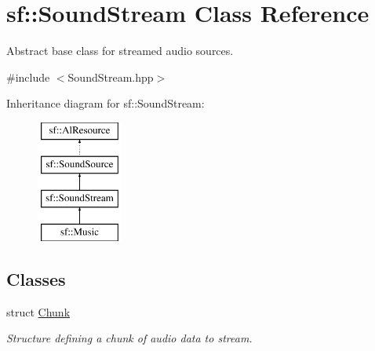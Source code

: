 \hypertarget{classsf_1_1_sound_stream}{}\section{sf\+:\+:Sound\+Stream Class Reference}
\label{classsf_1_1_sound_stream}


Abstract base class for streamed audio sources.  




{\ttfamily \#include $<$Sound\+Stream.\+hpp$>$}

Inheritance diagram for sf\+:\+:Sound\+Stream\+:\begin{figure}[H]
\begin{center}
\leavevmode
\includegraphics[height=4.000000cm]{classsf_1_1_sound_stream}
\end{center}
\end{figure}
\subsection*{Classes}
\begin{DoxyCompactItemize}
\item 
struct \mbox{\hyperlink{structsf_1_1_sound_stream_1_1_chunk}{Chunk}}
\begin{DoxyCompactList}\small\item\em Structure defining a chunk of audio data to stream. \end{DoxyCompactList}\end{DoxyCompactItemize}
